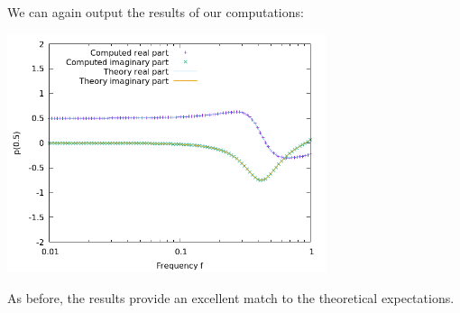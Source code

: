 \documentclass{article}
\begin{document}
We can again output the results of our computations:
\begin{center}
\includegraphics[width=0.7\textwidth]{with-attenuation/pressure-at-center.png}
\end{center}
As before, the results provide an excellent match to the theoretical expectations.
\end{document}
